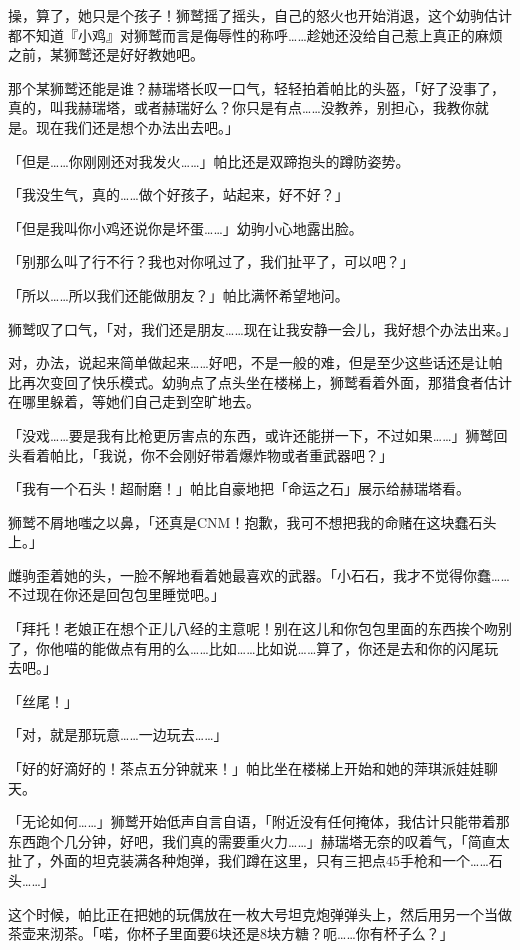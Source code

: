 操，算了，她只是个孩子！狮鹫摇了摇头，自己的怒火也开始消退，这个幼驹估计都不知道『小鸡』对狮鹫而言是侮辱性的称呼……趁她还没给自己惹上真正的麻烦之前，某狮鹫还是好好教她吧。

那个某狮鹫还能是谁？赫瑞塔长叹一口气，轻轻拍着帕比的头盔，「好了没事了，真的，叫我赫瑞塔，或者赫瑞好么？你只是有点……没教养，别担心，我教你就是。现在我们还是想个办法出去吧。」

「但是……你刚刚还对我发火……」帕比还是双蹄抱头的蹲防姿势。

「我没生气，真的……做个好孩子，站起来，好不好？」

「但是我叫你小鸡还说你是坏蛋……」幼驹小心地露出脸。

「别那么叫了行不行？我也对你吼过了，我们扯平了，可以吧？」

「所以……所以我们还能做朋友？」帕比满怀希望地问。

狮鹫叹了口气，「对，我们还是朋友……现在让我安静一会儿，我好想个办法出来。」

对，办法，说起来简单做起来……好吧，不是一般的难，但是至少这些话还是让帕比再次变回了快乐模式。幼驹点了点头坐在楼梯上，狮鹫看着外面，那猎食者估计在哪里躲着，等她们自己走到空旷地去。

「没戏……要是我有比枪更厉害点的东西，或许还能拼一下，不过如果……」狮鹫回头看着帕比，「我说，你不会刚好带着爆炸物或者重武器吧？」

「我有一个石头！超耐磨！」帕比自豪地把「命运之石」展示给赫瑞塔看。

狮鹫不屑地嗤之以鼻，「还真是CNM！抱歉，我可不想把我的命赌在这块蠢石头上。」

雌驹歪着她的头，一脸不解地看着她最喜欢的武器。「小石石，我才不觉得你蠢……不过现在你还是回包包里睡觉吧。」

「拜托！老娘正在想个正儿八经的主意呢！别在这儿和你包包里面的东西挨个吻别了，你他喵的能做点有用的么……比如……比如说……算了，你还是去和你的闪尾玩去吧。」

「丝尾！」

「对，就是那玩意……一边玩去……」

「好的好滴好的！茶点五分钟就来！」帕比坐在楼梯上开始和她的萍琪派娃娃聊天。

「无论如何……」狮鹫开始低声自言自语，「附近没有任何掩体，我估计只能带着那东西跑个几分钟，好吧，我们真的需要重火力……」赫瑞塔无奈的叹着气，「简直太扯了，外面的坦克装满各种炮弹，我们蹲在这里，只有三把点45手枪和一个……石头……」


这个时候，帕比正在把她的玩偶放在一枚大号坦克炮弹弹头上，然后用另一个当做茶壶来沏茶。「喏，你杯子里面要6块还是8块方糖？呃……你有杯子么？」


